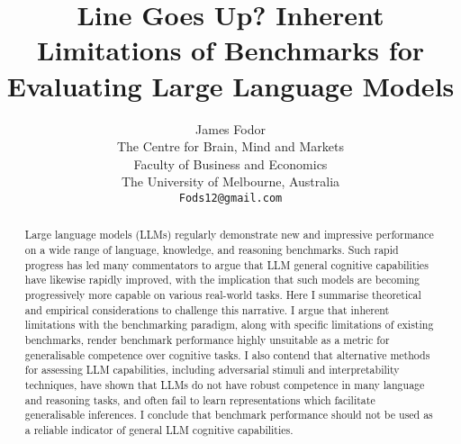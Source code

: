 \documentclass{article}
\title{Line Goes Up? Inherent Limitations of Benchmarks for Evaluating Large Language Models}
\author{
 James Fodor \\
 The Centre for Brain, Mind and Markets \\
 Faculty of Business and Economics\\ 
 The University of Melbourne, Australia \\
 \texttt{Fods12@gmail.com} \\
}
\begin{document}
\maketitle
\begin{abstract}
Large language models (LLMs) regularly demonstrate new and impressive performance on a wide range of language, knowledge, and reasoning benchmarks. Such rapid progress has led many commentators to argue that LLM general cognitive capabilities have likewise rapidly improved, with the implication that such models are becoming progressively more capable on various real-world tasks. Here I summarise theoretical and empirical considerations to challenge this narrative. I argue that inherent limitations with the benchmarking paradigm, along with specific limitations of existing benchmarks, render benchmark performance highly unsuitable as a metric for generalisable competence over cognitive tasks. I also contend that alternative methods for assessing LLM capabilities, including adversarial stimuli and interpretability techniques, have shown that LLMs do not have robust competence in many language and reasoning tasks, and often fail to learn representations which facilitate generalisable inferences. I conclude that benchmark performance should not be used as a reliable indicator of general LLM cognitive capabilities.
\end{abstract}


\end{document}
